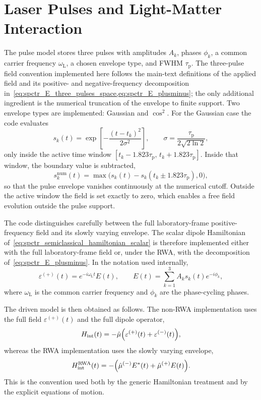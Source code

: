 \section{Laser Pulses and Light-Matter Interaction}
\label{app:sec:laser_field}

The pulse model stores three pulses with amplitudes $A_k$, phases $\phi_k$, a
common carrier frequency $\omega_{\mathrm{L}}$, a chosen envelope type, and FWHM
$\tau_{\mathrm{p}}$. The three-pulse field convention implemented here follows
the main-text definitions of the applied field and its positive- and
negative-frequency decomposition
in~\cref{eq:spctr_E_three_pulses_space,eq:spctr_E_plusminus}; the only
additional ingredient is the numerical truncation of the envelope to finite
support. Two envelope types are implemented: Gaussian and \(\cos^2\). For the
Gaussian case the code evaluates
\begin{equation*}
s_k(t)
=
\exp\!\left[
-\frac{(t-t_k)^2}{2\sigma^2}
\right],
\qquad
\sigma = \frac{\tau_{\mathrm{p}}}{2\sqrt{2\ln 2}},
\end{equation*}
only inside the active time window
\([t_k-1.823\tau_{\mathrm{p}},\, t_k+1.823\tau_{\mathrm{p}}]\). Inside that
window, the boundary value is subtracted,
\begin{equation*}
s_k^{\mathrm{num}}(t) = \max\!\bigl(s_k(t)-s_k(t_k \pm 1.823\tau_{\mathrm{p}}),0\bigr),
\end{equation*}
so that the pulse envelope vanishes continuously at the numerical cutoff.
Outside the active window the field is set exactly to zero, which enables a
free field evolution outside the pulse support.

The code distinguishes carefully between the full laboratory-frame
positive-frequency field and its slowly varying envelope. The scalar dipole
Hamiltonian of~\autoref{eq:spctr_semiclassical_hamiltonian_scalar} is therefore
implemented either with the full laboratory-frame field or, under the RWA, with
the decomposition of~\autoref{eq:spctr_E_plusminus}. In the notation used
internally,
\begin{equation*}
\varepsilon^{(+)}(t) = e^{-i\omega_{\mathrm{L}} t} E(t),
\qquad
E(t) = \sum_{k=1}^{3} A_k s_k(t)e^{-i\phi_k},
\end{equation*}
where \(\omega_{\mathrm{L}}\) is the common carrier frequency and \(\phi_k\) are the
phase-cycling phases.

The driven model is then obtained as follows. The non-RWA implementation uses
the full field \(\varepsilon^{(+)}(t)\) and the full dipole operator,
\begin{equation*}
H_{\mathrm{int}}(t)
=
-\hat{\mu}\Bigl(\varepsilon^{(+)}(t)+\varepsilon^{(-)}(t)\Bigr),
\end{equation*}
whereas the RWA implementation uses the slowly varying envelope,
\begin{equation*}
H_{\mathrm{int}}^{\mathrm{RWA}}(t)
=
-\Bigl(\hat{\mu}^{(-)}E^{*}(t)+\hat{\mu}^{(+)}E(t)\Bigr).
\end{equation*}
This is the convention used both by the generic Hamiltonian treatment and by
the explicit equations of motion.


